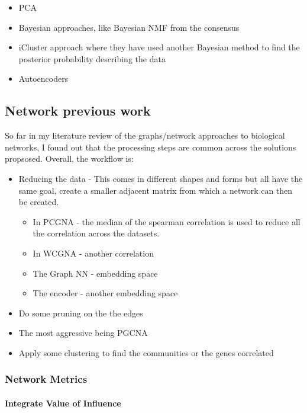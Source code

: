 \begin{itemize}
    \item PCA
    \item Bayesian approaches, like Bayesian NMF from the consensus 
    \item iCluster approach where they have used another Bayesian method to find the posterior probability describing the data
    \item Autoencoders
    
\end{itemize}

\newpage


\subsection{Network previous work}

So far in my literature review of the graphs/network approaches to biological networks, I found out that the processing steps are common across the solutions propsosed. Overall, the workflow is:
\begin{itemize}
    \item Reducing the data - This comes in different shapes and forms but all have the same goal, create a smaller adjacent matrix from which a network can then be created.
    \begin{itemize}
        \item In PCGNA - the median of the spearman correlation is used to reduce all the correlation across the datasets.
        \item In WCGNA - another correlation
        \item The Graph NN - embedding space
        \item The encoder - another embedding space
    \end{itemize}
    \item Do some pruning on the the edges
    \item The most aggressive being PGCNA 
    \item Apply some clustering to find the communities or the genes correlated 
\end{itemize}



\subsubsection{Network Metrics}

\paragraph{Integrate Value of Influence}

